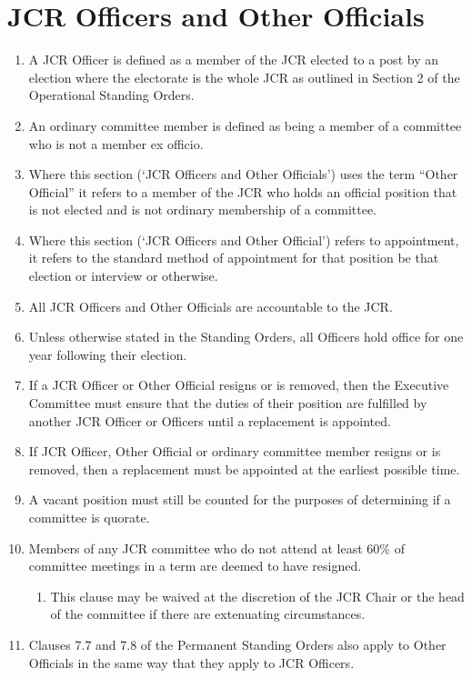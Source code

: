 \documentclass[12pt]{article}  %
\begin{document}
\section{JCR Officers and Other Officials}
\begin{enumerate}
	\item A JCR Officer is defined as a member of the JCR elected to a post by an election where the electorate is the whole JCR as outlined in Section 2 of the Operational Standing Orders.
	\item An ordinary committee member is defined as being a member of a committee who is not a member ex officio.
	\item Where this section (‘JCR Officers and Other Officials’) uses the term “Other Official” it refers to a member of the JCR who holds an official position that is not elected and is not ordinary membership of a committee.
	\item Where this section (‘JCR Officers and Other Official’) refers to appointment, it refers to the standard method of appointment for that position be that election or interview or otherwise.
	\item All JCR Officers and Other Officials are accountable to the JCR.
	\item Unless otherwise stated in the Standing Orders, all Officers hold office for one year following their election.
	\item If a JCR Officer or Other Official resigns or is removed, then the Executive Committee must ensure that the duties of their position are fulfilled by another JCR Officer or Officers until a replacement is appointed.
	\item If JCR Officer, Other Official or ordinary committee member resigns or is removed, then a replacement must be appointed at the earliest possible time.
	\item A vacant position must still be counted for the purposes of determining if a committee is quorate.
	\item Members of any JCR committee who do not attend at least 60\% of committee meetings in a term are deemed to have resigned.
	\begin{enumerate}
		\item This clause may be waived at the discretion of the JCR Chair or the head of the committee if there are extenuating circumstances.
	\end{enumerate}
	\item Clauses 7.7 and 7.8 of the Permanent Standing Orders also apply to Other Officials in the same way that they apply to JCR Officers.

\end{enumerate}
\end{document}
